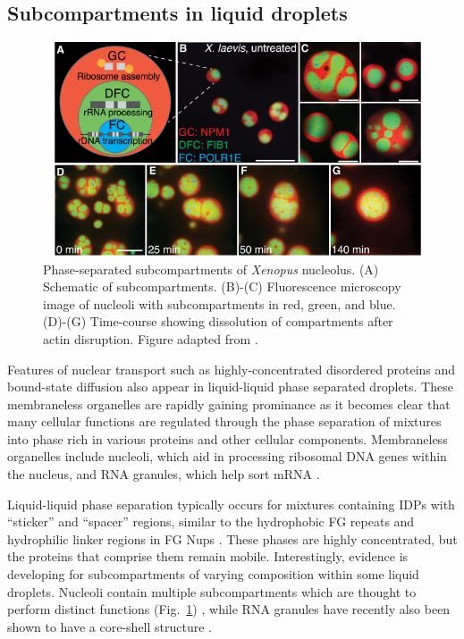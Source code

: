 \subsection{Subcompartments in liquid droplets}

\begin{figure}
\centering
\includegraphics[width=0.8\linewidth]{figs/ch01/feric16.pdf}
\caption[Phase-separated subcompartments of the nucleolus.]{ Phase-separated subcompartments of \textit{Xenopus} nucleolus. (A) Schematic of subcompartments. (B)-(C) Fluorescence microscopy image of nucleoli with subcompartments in red, green, and blue. (D)-(G) Time-course showing dissolution of compartments after actin disruption. Figure adapted from \cite{feric16}.}
\label{fig:nucleolus}
\end{figure}

Features of nuclear transport such as highly-concentrated disordered proteins and bound-state diffusion also appear in liquid-liquid phase separated droplets.  These membraneless organelles are rapidly gaining prominance as it becomes clear that many cellular functions are regulated through the phase separation of mixtures into phase rich in various proteins and other cellular components.  Membraneless organelles include nucleoli, which aid in processing ribosomal DNA genes within the nucleus, and RNA granules, which help sort mRNA \cite{shiina19, brangwynne15}.

Liquid-liquid phase separation typically occurs for mixtures containing IDPs with ``sticker'' and ``spacer'' regions, similar to the hydrophobic FG repeats and hydrophilic linker regions in FG Nups \cite{posey18}.  These phases are highly concentrated, but the proteins that comprise them remain mobile.  Interestingly, evidence is developing for subcompartments of varying composition within some liquid droplets.  Nucleoli contain multiple subcompartments which are thought to perform distinct functions (Fig.~\ref{fig:nucleolus}) \cite{feric16,catalano15,oday19}, while RNA granules have recently also been shown to have a core-shell structure \cite{jain16,shiina19}.

